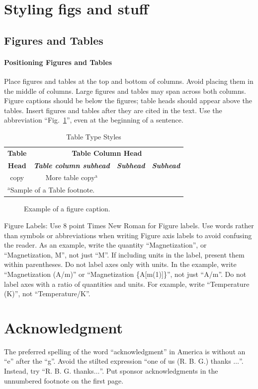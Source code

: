 \documentclass[conference]{IEEEtran}
\begin{document}
\section{Styling figs and stuff}
\subsection{Figures and Tables}
\paragraph{Positioning Figures and Tables} Place figures and tables at the top and 
bottom of columns. Avoid placing them in the middle of columns. Large 
figures and tables may span across both columns. Figure captions should be 
below the figures; table heads should appear above the tables. Insert 
figures and tables after they are cited in the text. Use the abbreviation 
``Fig.~\ref{fig}'', even at the beginning of a sentence.

\begin{table}[htbp]
\caption{Table Type Styles}
\begin{center}
\begin{tabular}{|c|c|c|c|}
\hline
\textbf{Table}&\multicolumn{3}{|c|}{\textbf{Table Column Head}} \\
\cline{2-4} 
\textbf{Head} & \textbf{\textit{Table column subhead}}& \textbf{\textit{Subhead}}& \textbf{\textit{Subhead}} \\
\hline
copy& More table copy$^{\mathrm{a}}$& &  \\
\hline
\multicolumn{4}{l}{$^{\mathrm{a}}$Sample of a Table footnote.}
\end{tabular}
\label{tab1}
\end{center}
\end{table}

\begin{figure}[htbp]
\caption{Example of a figure caption.}
\label{fig}
\end{figure}

Figure Labels: Use 8 point Times New Roman for Figure labels. Use words 
rather than symbols or abbreviations when writing Figure axis labels to 
avoid confusing the reader. As an example, write the quantity 
``Magnetization'', or ``Magnetization, M'', not just ``M''. If including 
units in the label, present them within parentheses. Do not label axes only 
with units. In the example, write ``Magnetization (A/m)'' or ``Magnetization 
\{A[m(1)]\}'', not just ``A/m''. Do not label axes with a ratio of 
quantities and units. For example, write ``Temperature (K)'', not 
``Temperature/K''.

\section*{Acknowledgment}

The preferred spelling of the word ``acknowledgment'' in America is without 
an ``e'' after the ``g''. Avoid the stilted expression ``one of us (R. B. 
G.) thanks $\ldots$''. Instead, try ``R. B. G. thanks$\ldots$''. Put sponsor 
acknowledgments in the unnumbered footnote on the first page.
\end{document}
